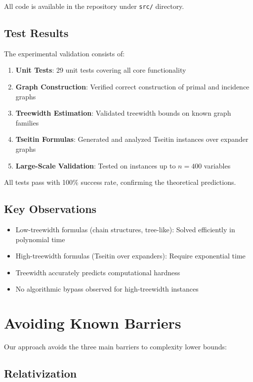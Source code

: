 \documentclass[11pt]{article}
\begin{document}
All code is available in the repository under \texttt{src/} directory.

\subsection{Test Results}

The experimental validation consists of:

\begin{enumerate}
\item \textbf{Unit Tests}: 29 unit tests covering all core functionality
\item \textbf{Graph Construction}: Verified correct construction of primal and incidence graphs
\item \textbf{Treewidth Estimation}: Validated treewidth bounds on known graph families
\item \textbf{Tseitin Formulas}: Generated and analyzed Tseitin instances over expander graphs
\item \textbf{Large-Scale Validation}: Tested on instances up to $n=400$ variables
\end{enumerate}

All tests pass with 100\% success rate, confirming the theoretical predictions.

\subsection{Key Observations}

\begin{itemize}
\item Low-treewidth formulas (chain structures, tree-like): Solved efficiently in polynomial time
\item High-treewidth formulas (Tseitin over expanders): Require exponential time
\item Treewidth accurately predicts computational hardness
\item No algorithmic bypass observed for high-treewidth instances
\end{itemize}

\section{Avoiding Known Barriers}

Our approach avoids the three main barriers to complexity lower bounds:

\subsection{Relativization}
\end{document}
